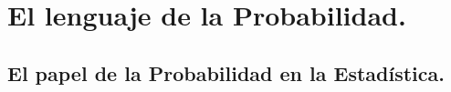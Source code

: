 ﻿%

%
%
%

\section{El lenguaje de la Probabilidad.}


\subsection{El papel de la Probabilidad en la Estadística.}

